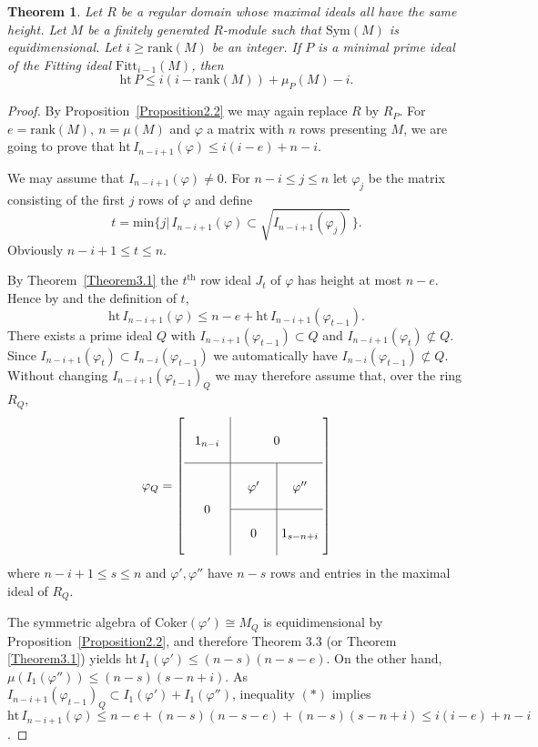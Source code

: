 \documentclass{proc-l}
\newcommand{\rank}{\mathrm{rank}}
\newcommand{\myth}{\mathrm{th}}
\newcommand{\Fitt}{\mathrm{Fitt}}
\newcommand{\hgt}{\mathrm{ht}}
\newcommand{\Sym}{\mathrm{ Sym}}
\newcommand{\p}{\varphi}
\newcommand{\inc}{\subset}
\newcommand{\rad}{\sqrt}
\newtheorem{Theorem}{Theorem}[section]
\theoremstyle{remark}
\theoremstyle{definition}
\begin{document}
\begin{Theorem}\label{Theorem2.4}  
Let $R$ be a regular domain whose maximal ideals
all have the same height. Let $M$ be a finitely generated
$R$-module such that $\Sym(M)$ is equidimensional.  Let $i\geq \rank(M)$ 
be an
integer. If $P$ is a minimal prime ideal of the Fitting
ideal
$\Fitt_{i-1}(M)$, then 
\begin{equation*}\hgt \, P \leq i(i-\rank(M))+\mu_P(M)-i.\end{equation*}
\end{Theorem}
\begin{proof}
By Proposition~\ref{Proposition2.2} we may again replace $R$ by $R_P$. For 
$e=\rank(M),\ n =
\mu(M)$ and $\p$ a matrix with $n$ rows presenting $M$, we are going to prove
that $\hgt\, I_{n-i+1}(\p) \leq i(i-e)+n-i$.

We may assume that
$I_{n-i+1}(\p)\ne
0$.
For $n-i\leq j\leq n$ let $\p_j$ be the matrix consisting of the first $j$
rows
of $\p$ and define
\begin{equation*} t = \mathrm{ min}\{j|\, I_{n-i+1}(\p)\inc \rad{I_{n-i+1}(\p_j)}\,\}.\end{equation*}
Obviously $n-i+1\leq t\leq n$. 


By Theorem~\ref{Theorem3.1} the $t^{\myth}$
 row ideal $J_t$ of $\p$ has height at most
$n-e$. Hence by \cite[Theorem 3, p.\ V-18]{S} and 
the definition of $t$,
\begin{equation*}
\hgt\, I_{n-i+1}(\p) \leq n-e + \hgt\, I_{n-i+1}(\p_{t-1}). 
\tag{$*$}
\end{equation*}
There exists a prime ideal $Q$ with $I_{n-i+1}(\p_{t-1})\inc Q$ and
$I_{n-i+1}(\p_t)\not\subset Q$. Since 
$I_{n-i+1}(\varphi_t)\subset I_{n-i}(\varphi_{t-1})$ we automatically
have $I_{n-i}(\varphi_{t-1})\not\subset Q$.
Without changing $I_{n-i+1}(\p_{t-1})_Q$ we
may therefore assume
that, over the ring $R_Q$,
\begin{equation*}
\varphi_Q=
\left[
\vcenter{
\hbox{%
\hbox to .5in{\hss$1_{n-i}$\hss}%
\vrule height .3in depth .2in
\hbox to 1.0055in{\hss$0$\hss}%
}
\hrule
\hbox{$
\vcenter{\hbox to .5in{\hss$0$\hss}}
\vrule
\vcenter{
\hbox{%
\hbox to .5in{\hss$\varphi'$\hss}%
\vrule height .3in depth .2in
\hbox to .5in{\hss$\varphi''$\hss}%
}
\hrule
\hbox{%
\hbox to .5in{\hss$0$\hss}%
\vrule height .3in depth .2in
\hbox to .5in{\hss$1_{s-n+i}$\hss}%
}}$}}
\right]
\end{equation*}
where $n-i+1\leq s\leq n$ and $\p', \p''$ have $n-s$ rows and entries in the
maximal ideal of $R_Q$.


The symmetric algebra of Coker$(\p')\cong M_Q$ is equidimensional by
Proposition~\ref{Proposition2.2}, and therefore Theorem 3.3
(or Theorem \ref{Theorem3.1}) yields
$\hgt\, I_1(\p')\leq (n-s)(n-s-e)$. On the other hand, $
\mu(I_1(\p''))\leq (n-s)(s-n+i)$. As $I_{n-i+1}(\p_{t-1})_Q\inc I_1(\p') +
I_1(\p'')$, inequality $(*)$ implies $\hgt\, I_{n-i+1}(\p)\leq n-e +
(n-s)(n-s-e) + (n-s)(s-n+i)
\leq i(i-e)+n-i$.
\end{proof}
\end{document}
